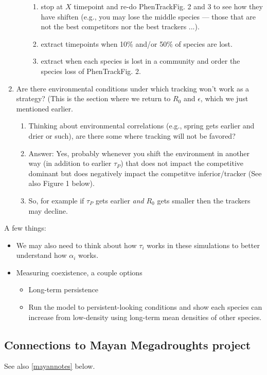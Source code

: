 \documentclass[11pt,a4paper,oneside]{article}
\newenvironment{smitemize}{
\begin{itemize}
  \setlength{\itemsep}{1pt}
  \setlength{\parskip}{0pt}
  \setlength{\parsep}{0pt}}
{\end{itemize}
}
\begin{document}
\begin{enumerate}
\begin{enumerate}
\begin{enumerate}
\item stop at $X$ timepoint and re-do PhenTrackFig. 2 and 3 to see how they have shiften (e.g., you may lose the middle species --- those that are not the best competitors nor the best trackers ...).
\item extract timepoints when 10\% and/or 50\% of species are lost. 
\item extract when each species is lost in a community and order the species loss of PhenTrackFig. 2.
\end{enumerate}
\end{enumerate}
\item Are there environmental conditions under which tracking won't work as a strategy? (This is the section where we return to $R_{0}$ and $\epsilon$, which we just mentioned earlier.
\begin{enumerate}
\item Thinking about environmental correlations (e.g., spring gets earlier and drier or such), are there some where tracking will not be favored?
\item Answer: Yes, probably whenever you shift the environment in another way (in addition to earlier $\tau_P$) that does not impact the competitive dominant but does negatively impact the competitve inferior/tracker (See also Figure 1 below). 
\item So, for example if $\tau_P$ gets earlier \emph{and} $R_0$ gets smaller then the trackers may decline.  
\end{enumerate}
\end{enumerate}

A few things:
\begin{smitemize}
\item We may also need to think about how $\tau_i$ works in these simulations to better understand how $\alpha_i$ works.
\item Measuring coexistence, a couple options
\begin{smitemize}
\item Long-term persistence
\item Run the model to persistent-looking conditions and show each species can increase from low-density using long-term mean densities of other species.
\end{smitemize}
\end{smitemize}

\subsection{Connections to Mayan Megadroughts project}
See also \ref{mayannotes} below.\\
\end{document}
